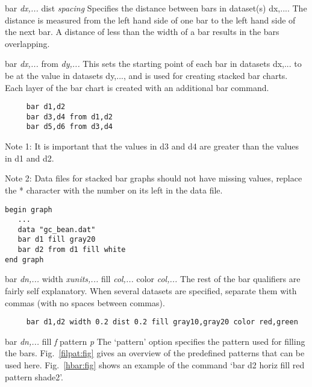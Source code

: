 \begin{commanddescription}
\item[{\sf bar {\it dx,...} dist {\it spacing}}]
Specifies the distance between bars in dataset(s) {\sf dx,...}.  The
distance is measured from the left hand side of one bar to the left hand side
of the next bar.  A distance of less than the width of a bar
results in the bars overlapping.

\item[{\sf bar {\it dx,...} from {\it dy,...}}]
This sets the starting point of each bar in datasets {\sf dx,...} to be at
the value in datasets {\sf dy,...}, and is used for creating stacked bar
charts.  Each layer of the bar chart is created with an additional bar command.

\preglecode{}
\begin{Verbatim}
     bar d1,d2
     bar d3,d4 from d1,d2
     bar d5,d6 from d3,d4
\end{Verbatim}
\postglecode{}

Note 1: It is important that the values in d3 and d4 are greater than
the values in d1 and d2.

Note 2: Data files for stacked bar graphs should not have
missing values, replace the * character with the number on its left in the
data file.

\begin{minipage}[c]{8cm}
\begin{Verbatim}
begin graph
   ...
   data "gc_bean.dat"
   bar d1 fill gray20
   bar d2 from d1 fill white
end graph
\end{Verbatim}
\end{minipage}
\hfill
\begin{minipage}[c]{7cm}
\mbox{}
\end{minipage}

 
\item[{\sf bar {\it dn,...} width {\it xunits,...} fill {\it col,...} color {\it col,...} }]
The rest of the bar qualifiers are fairly self explanatory.
When several datasets are specified, separate them with commas
(with no spaces between commas).

\preglecode{}
\begin{Verbatim}
     bar d1,d2 width 0.2 dist 0.2 fill gray10,gray20 color red,green
\end{Verbatim}
\postglecode{}

\item[{\sf bar {\it dn,...} fill {\it f} pattern {\it p}}]
The `{\sf pattern}' option specifies the pattern used for filling the bars. Fig.~\ref{filpat:fig} gives an overview of the predefined patterns that can be used here. Fig.~\ref{hbar:fig} shows an example of the command `{\sf bar d2 horiz fill red pattern shade2}'.


\end{commanddescription}

